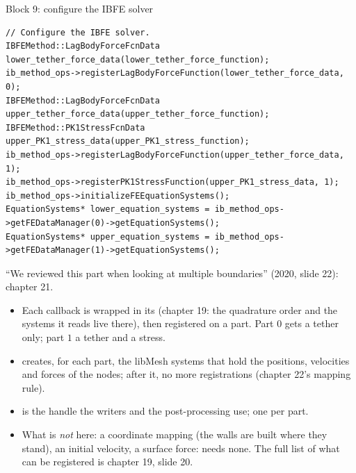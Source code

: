 \documentclass[aspectratio=169,11pt]{beamer}
\begin{document}
\begin{frame}[fragile]{Block 9: configure the IBFE solver}
\label{fr:ibfe}
\begin{lstlisting}[style=cpptiny]
// Configure the IBFE solver.
IBFEMethod::LagBodyForceFcnData lower_tether_force_data(lower_tether_force_function);
ib_method_ops->registerLagBodyForceFunction(lower_tether_force_data, 0);
IBFEMethod::LagBodyForceFcnData upper_tether_force_data(upper_tether_force_function);
IBFEMethod::PK1StressFcnData upper_PK1_stress_data(upper_PK1_stress_function);
ib_method_ops->registerLagBodyForceFunction(upper_tether_force_data, 1);
ib_method_ops->registerPK1StressFunction(upper_PK1_stress_data, 1);
ib_method_ops->initializeFEEquationSystems();
EquationSystems* lower_equation_systems = ib_method_ops->getFEDataManager(0)->getEquationSystems();
EquationSystems* upper_equation_systems = ib_method_ops->getFEDataManager(1)->getEquationSystems();
\end{lstlisting}
\footnotesize
``We reviewed this part when looking at multiple boundaries'' (2020, slide 22): chapter 21.
\begin{itemize}
  \item Each callback is wrapped in its  (chapter 19: the quadrature order and the systems it reads live there), then registered on a part. Part $0$ gets a tether only; part $1$ a tether and a stress.
  \item {} creates, for each part, the libMesh systems that hold the positions, velocities and forces of the nodes; after it, no more registrations (chapter 22's mapping rule).
  \item {} is the handle the writers and the post-processing use; one per part.
  \item What is \emph{not} here: a coordinate mapping (the walls are built where they stand), an initial velocity, a surface force:  needs none. The full list of what can be registered is chapter 19, slide 20.
\end{itemize}
\end{frame}
\end{document}
